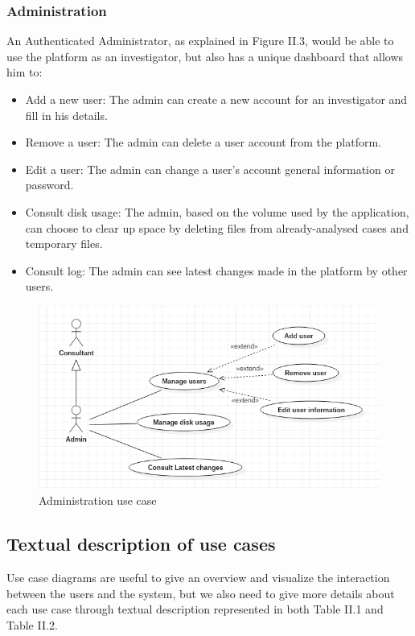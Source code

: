\subsubsection{Administration}
An Authenticated Administrator, as explained in Figure II.3, would be able to use the platform as an investigator, but also has a unique dashboard that allows him to:
\begin{itemize}
    \item Add a new user: The admin can create a new account for an investigator and fill in his details.
    \item Remove a user: The admin can delete a user account from the platform.
    \item Edit a user: The admin can change a user's account general information or password.
    \item Consult disk usage: The admin, based on the volume used by the application, can choose to clear up space by deleting files from already-analysed cases and temporary files.
    \item Consult log: The admin can see latest changes made in the platform by other users.
\end{itemize}
\begin{figure}[H]
\centering
\includegraphics[width=1\columnwidth]{Figures/usecase2.png}
\caption{Administration use case}
\end{figure}

\subsection{Textual description of use cases}
Use case diagrams are useful to give an overview and visualize the interaction between the users and the system, but we also need to give more details about each use case through textual description represented in both Table II.1 and Table II.2. 

